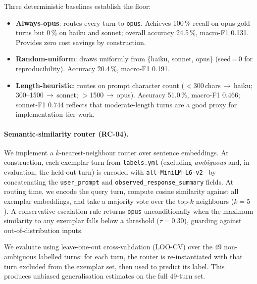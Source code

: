 Three deterministic baselines establish the floor:
\begin{itemize}
  \item \textbf{Always-opus}: routes every turn to \texttt{opus}.
    Achieves 100\,\% recall on opus-gold turns but 0\,\% on haiku and sonnet;
    overall accuracy 24.5\,\%, macro-F1 0.131.
    Provides zero cost savings by construction.
  \item \textbf{Random-uniform}: draws uniformly from \{haiku, sonnet, opus\}
    (seed\,=\,0 for reproducibility).
    Accuracy 20.4\,\%, macro-F1 0.191.
  \item \textbf{Length-heuristic}: routes on prompt character count
    ($<$300\,chars\,$\to$\,haiku; 300–1500\,$\to$\,sonnet; $>$1500\,$\to$\,opus).
    Accuracy 51.0\,\%, macro-F1 0.466; sonnet-F1 0.744 reflects that moderate-length
    turns are a good proxy for implementation-tier work.
\end{itemize}

\paragraph{Semantic-similarity router (RC-04).}
We implement a $k$-nearest-neighbour router over sentence embeddings.
At construction, each exemplar turn from \texttt{labels.yml} (excluding
\emph{ambiguous} and, in evaluation, the held-out turn) is encoded with
\texttt{all-MiniLM-L6-v2}~\cite{reimers2019sentencebert} by concatenating
the \texttt{user\_prompt} and \texttt{observed\_response\_summary} fields.
At routing time, we encode the query turn, compute cosine similarity against
all exemplar embeddings, and take a majority vote over the top-$k$
neighbours ($k\!=\!5$).
A conservative-escalation rule returns \texttt{opus} unconditionally when
the maximum similarity to any exemplar falls below a threshold
($\tau\!=\!0.30$), guarding against out-of-distribution inputs.

We evaluate using leave-one-out cross-validation (LOO-CV) over the 49
non-ambiguous labelled turns: for each turn, the router is re-instantiated
with that turn excluded from the exemplar set, then used to predict its label.
This produces unbiased generalisation estimates on the full 49-turn set.


